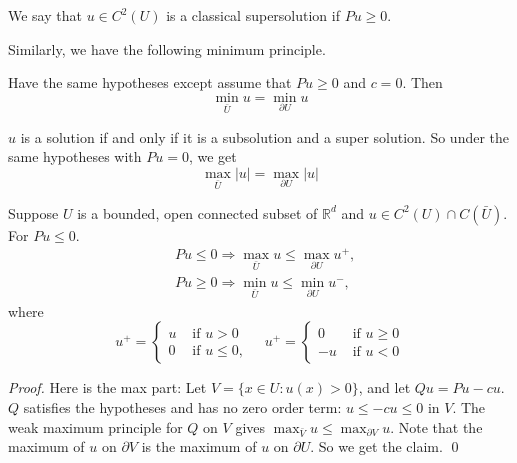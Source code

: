 \begin{definition}
\label{def: (Classical) supersolution}
We say that $u\in C^2(U)$ is a classical supersolution if $Pu\ge 0$.
\end{definition}

Similarly, we have the following minimum principle.
\begin{theorem}
\label{thm: Weak minimum principle}
 Have the same hypotheses except assume that $P u \geq 0$ and $c=0$. Then
$$
\min _{\bar{U}} u=\min _{\partial U} u
$$
\end{theorem}

\begin{remark}
$u$ is a solution if and only if it is a subsolution and a super solution. So under the same hypotheses with $P u=0$, we get
$$
\max _{\bar{U}}|u|=\max _{\partial U}|u|
$$
\end{remark}


\begin{corollary}
\label{thm: Weak maximum principle, cge0}
Suppose $U$ is a bounded, open connected subset of $\mathbb{R}^{d}$ and $u \in C^{2}(U) \cap C(\bar{U})$. For $P u \leq 0$.
$$
\begin{aligned}
&P u \leq 0 \Longrightarrow \max _{\bar{U}} u\leq \max _{\partial U} u^{+}, \\
&P u \geq 0 \Longrightarrow \min _{\bar{U}} u\leq \min _{\partial U} u^{-},
\end{aligned}
$$
where
$$
u^{+}=\left\{\begin{array}{ll}
u & \text { if } u>0 \\
0 & \text { if } u \leq 0,
\end{array} \quad u^{+}= \begin{cases}0 & \text { if } u \geq 0 \\
-u & \text { if } u<0\end{cases}\right.
$$
\end{corollary}
\begin{proof}
 Here is the max part: Let $V=\{x \in U: u(x)>0\}$, and let $Q u=P u-c u$. $Q$ satisfies the hypotheses and has no zero order term: $u \leq-c u \leq 0$ in $V$. The weak maximum principle for $Q$ on $V$ gives $\max _{\bar{V}} u \leq \max _{\partial V} u$. Note that the maximum of $u$ on $\partial V$ is the maximum of $u$ on $\partial U$. So we get the claim.
\qed
\end{proof}

